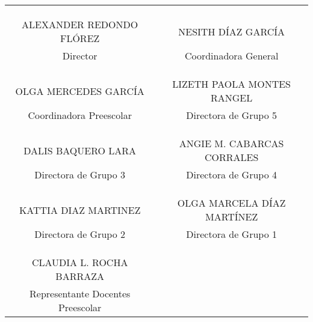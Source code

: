 \setlength{\arrayrulewidth}{0mm}
\begin{center}
\begin{tabular} {|c{7cm}|c{7cm}|} 
         \hline
         \\
         \\
         \\
         ALEXANDER REDONDO FLÓREZ & NESITH DÍAZ GARCÍA\\
         Director & Coordinadora General \\
         \hline
         \\
         \\
         \\
         OLGA MERCEDES GARCÍA & LIZETH PAOLA MONTES RANGEL  \\
         Coordinadora Preescolar & Directora de Grupo 5\\
         \hline
         \\
         \\
         \\
         DALIS BAQUERO LARA & ANGIE M. CABARCAS CORRALES \\
         Directora de Grupo 3 & Directora de Grupo 4\\
         \hline
         \\
         \\
         \\
         KATTIA DIAZ MARTINEZ & OLGA MARCELA DÍAZ MARTÍNEZ\\
         Directora de Grupo 2 & Directora de Grupo 1\\
         \hline
         \\
         \\
         \\
         CLAUDIA L. ROCHA BARRAZA\\
         Representante Docentes Preescolar\\
         \hline
\end{tabular}    
\end{center}


